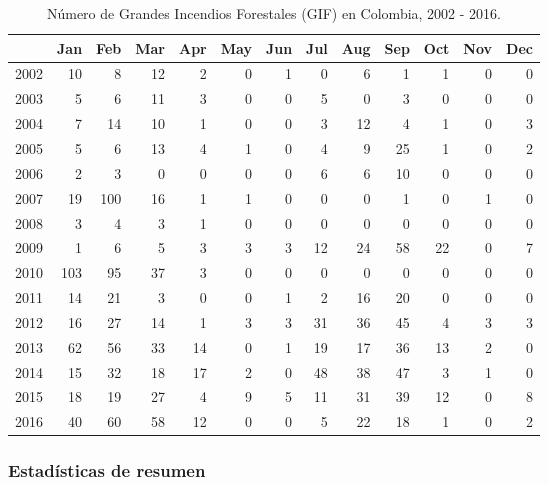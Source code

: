 \documentclass[a4paper]{article}\usepackage[]{graphicx}\usepackage[]{color}
\begin{document}
\begin{table}[ht]
\centering
\begin{tabular}{rrrrrrrrrrrrr}
  \hline
 & Jan & Feb & Mar & Apr & May & Jun & Jul & Aug & Sep & Oct & Nov & Dec \\ 
  \hline
2002 &  10 &   8 &  12 &   2 &   0 &   1 &   0 &   6 &   1 &   1 &   0 &   0 \\ 
  2003 &   5 &   6 &  11 &   3 &   0 &   0 &   5 &   0 &   3 &   0 &   0 &   0 \\ 
  2004 &   7 &  14 &  10 &   1 &   0 &   0 &   3 &  12 &   4 &   1 &   0 &   3 \\ 
  2005 &   5 &   6 &  13 &   4 &   1 &   0 &   4 &   9 &  25 &   1 &   0 &   2 \\ 
  2006 &   2 &   3 &   0 &   0 &   0 &   0 &   6 &   6 &  10 &   0 &   0 &   0 \\ 
  2007 &  19 & 100 &  16 &   1 &   1 &   0 &   0 &   0 &   1 &   0 &   1 &   0 \\ 
  2008 &   3 &   4 &   3 &   1 &   0 &   0 &   0 &   0 &   0 &   0 &   0 &   0 \\ 
  2009 &   1 &   6 &   5 &   3 &   3 &   3 &  12 &  24 &  58 &  22 &   0 &   7 \\ 
  2010 & 103 &  95 &  37 &   3 &   0 &   0 &   0 &   0 &   0 &   0 &   0 &   0 \\ 
  2011 &  14 &  21 &   3 &   0 &   0 &   1 &   2 &  16 &  20 &   0 &   0 &   0 \\ 
  2012 &  16 &  27 &  14 &   1 &   3 &   3 &  31 &  36 &  45 &   4 &   3 &   3 \\ 
  2013 &  62 &  56 &  33 &  14 &   0 &   1 &  19 &  17 &  36 &  13 &   2 &   0 \\ 
  2014 &  15 &  32 &  18 &  17 &   2 &   0 &  48 &  38 &  47 &   3 &   1 &   0 \\ 
  2015 &  18 &  19 &  27 &   4 &   9 &   5 &  11 &  31 &  39 &  12 &   0 &   8 \\ 
  2016 &  40 &  60 &  58 &  12 &   0 &   0 &   5 &  22 &  18 &   1 &   0 &   2 \\ 
   \hline
\end{tabular}
\caption{Número de Grandes Incendios Forestales (GIF) en Colombia, 2002 - 2016.} 
\end{table}


\subsubsection*{Estadísticas de resumen}
\end{document}
